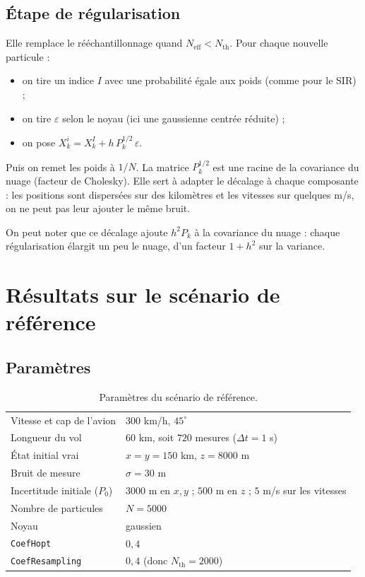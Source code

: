 \documentclass[11pt]{article}
\begin{document}
\subsection{Étape de régularisation}

Elle remplace le rééchantillonnage quand $N_{\mathrm{eff}} < N_{\mathrm{th}}$. Pour chaque
nouvelle particule :
\begin{itemize}
\item on tire un indice $I$ avec une probabilité égale aux poids (comme pour le SIR) ;
\item on tire $\varepsilon$ selon le noyau (ici une gaussienne centrée réduite) ;
\item on pose $X_k^i = X_k^I + h \, P_k^{1/2} \, \varepsilon$.
\end{itemize}
Puis on remet les poids à $1/N$. La matrice $P_k^{1/2}$ est une racine de la covariance
du nuage (facteur de Cholesky). Elle sert à adapter le décalage à chaque composante :
les positions sont dispersées sur des kilomètres et les vitesses sur quelques m/s, on
ne peut pas leur ajouter le même bruit.

On peut noter que ce décalage ajoute $h^2 P_k$ à la covariance du nuage : chaque
régularisation élargit un peu le nuage, d'un facteur $1 + h^2$ sur la variance.

\section{Résultats sur le scénario de référence}

\subsection{Paramètres}

\begin{table}[H]
\centering
\begin{tabular}{ll}
\toprule
Vitesse et cap de l'avion & $300$ km/h, $45^\circ$ \\
Longueur du vol & $60$ km, soit $720$ mesures ($\Delta t = 1$ s) \\
État initial vrai & $x = y = 150$ km, $z = 8000$ m \\
Bruit de mesure & $\sigma = 30$ m \\
Incertitude initiale ($P_0$) & $3000$ m en $x, y$ ; $500$ m en $z$ ; $5$ m/s sur les vitesses \\
Nombre de particules & $N = 5000$ \\
Noyau & gaussien \\
\texttt{CoefHopt} & $0{,}4$ \\
\texttt{CoefResampling} & $0{,}4$ (donc $N_{\mathrm{th}} = 2000$) \\
\bottomrule
\end{tabular}
\caption{Paramètres du scénario de référence.}
\end{table}
\end{document}
